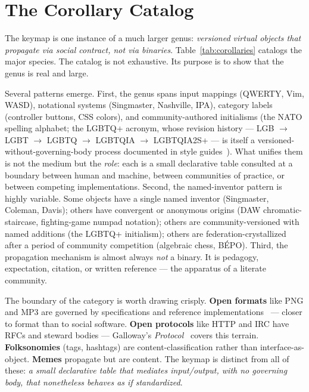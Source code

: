 \documentclass[10pt,letterpaper,twocolumn]{article}
\begin{document}
\section{The Corollary Catalog}
\label{sec:corollaries}

The keymap is one instance of a much larger genus: \emph{versioned virtual objects that propagate via social contract, not via binaries}. Table~\ref{tab:corollaries} catalogs the major species. The catalog is not exhaustive. Its purpose is to show that the genus is real and large.


Several patterns emerge. First, the genus spans input mappings (QWERTY, Vim, WASD), notational systems (Singmaster, Nashville, IPA), category labels (controller buttons, CSS colors), and community-authored initialisms (the NATO spelling alphabet; the LGBTQ+ acronym, whose revision history --- LGB $\rightarrow$ LGBT $\rightarrow$ LGBTQ $\rightarrow$ LGBTQIA $\rightarrow$ LGBTQIA2S+ --- is itself a versioned-without-governing-body process documented in style guides~\citep{glaad_reference_guide}). What unifies them is not the medium but the \emph{role}: each is a small declarative table consulted at a boundary between human and machine, between communities of practice, or between competing implementations. Second, the named-inventor pattern is highly variable. Some objects have a single named inventor (Singmaster, Coleman, Davis); others have convergent or anonymous origins (DAW chromatic-staircase, fighting-game numpad notation); others are community-versioned with named additions (the LGBTQ+ initialism); others are federation-crystallized after a period of community competition (algebraic chess, BÉPO). Third, the propagation mechanism is almost always \emph{not} a binary. It is pedagogy, expectation, citation, or written reference --- the apparatus of a literate community.

The boundary of the category is worth drawing crisply. \textbf{Open formats} like PNG and MP3 are governed by specifications and reference implementations~\citep{sterne2012mp3} --- closer to format than to social software. \textbf{Open protocols} like HTTP and IRC have RFCs and steward bodies --- Galloway's \emph{Protocol}~\citep{galloway2004protocol} covers this terrain. \textbf{Folksonomies} (tags, hashtags) are content-classification rather than interface-as-object. \textbf{Memes} propagate but are content. The keymap is distinct from all of these: \emph{a small declarative table that mediates input/output, with no governing body, that nonetheless behaves as if standardized}.
\end{document}
